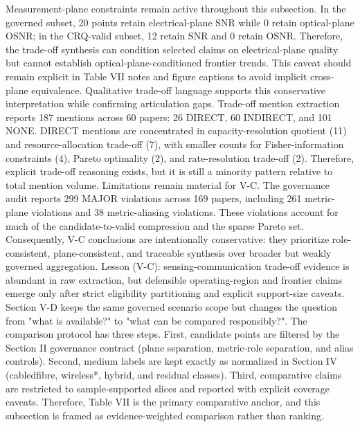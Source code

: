 {}Measurement-plane constraints remain active throughout this subsection. In the governed subset, 20 points retain electrical-plane SNR while 0 retain optical-plane OSNR; in the CRQ-valid subset, 12 retain SNR and 0 retain OSNR. Therefore, the trade-off synthesis can condition selected claims on electrical-plane quality but cannot establish optical-plane-conditioned frontier trends. This caveat should remain explicit in Table VII notes and figure captions to avoid implicit cross-plane equivalence.\markdownRendererParagraphSeparator
{}Qualitative trade-off language supports this conservative interpretation while confirming articulation gaps. Trade-off mention extraction reports 187 mentions across 60 papers: 26 DIRECT, 60 INDIRECT, and 101 NONE. DIRECT mentions are concentrated in capacity-resolution quotient (11) and resource-allocation trade-off (7), with smaller counts for Fisher-information constraints (4), Pareto optimality (2), and rate-resolution trade-off (2). Therefore, explicit trade-off reasoning exists, but it is still a minority pattern relative to total mention volume.\markdownRendererParagraphSeparator
{}Limitations remain material for V-C. The governance audit reports 299 MAJOR violations across 169 papers, including 261 metric-plane violations and 38 metric-aliasing violations. These violations account for much of the candidate-to-valid compression and the sparse Pareto set. Consequently, V-C conclusions are intentionally conservative: they prioritize role-consistent, plane-consistent, and traceable synthesis over broader but weakly governed aggregation.\markdownRendererParagraphSeparator
{}Lesson (V-C): sensing-communication trade-off evidence is abundant in raw extraction, but defensible operating-region and frontier claims emerge only after strict eligibility partitioning and explicit support-size caveats.\markdownRendererInterblockSeparator
{}
\markdownRendererSectionEnd \markdownRendererSectionBegin
{}\markdownRendererInterblockSeparator
{}Section V-D keeps the same governed scenario scope but changes the question from "what is available?" to "what can be compared responsibly?". The comparison protocol has three steps. First, candidate points are filtered by the Section II governance contract (plane separation, metric-role separation, and alias controls). Second, medium labels are kept exactly as normalized in Section IV (cabled\markdownRendererUnderscore{}fibre, wireless\markdownRendererUnderscore{}*, hybrid, and residual classes). Third, comparative claims are restricted to sample-supported slices and reported with explicit coverage caveats. Therefore, Table VII is the primary comparative anchor, and this subsection is framed as evidence-weighted comparison rather than ranking.\markdownRendererParagraphSeparator

